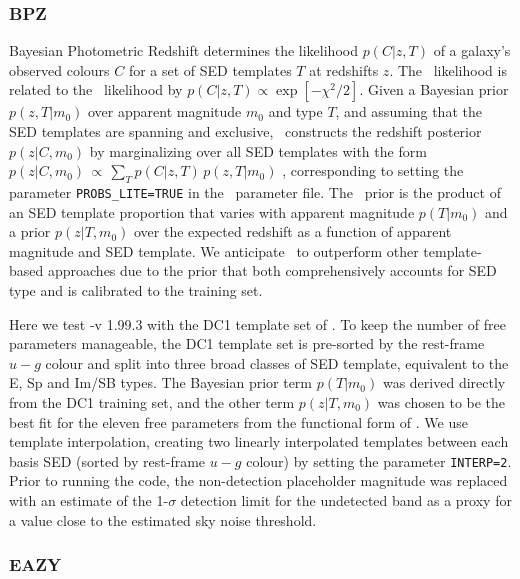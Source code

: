 \subsubsection{BPZ}

Bayesian Photometric Redshift \citep[\bpz\footnote{\url{http://www.stsci.edu/~dcoe/BPZ/}},][]{benitez_bayesian_2000} determines the likelihood $p(C \vert z, T)$ of a galaxy's observed colours $C$ for a set of SED templates $T$ at redshifts $z$.
The \bpz\ likelihood is related to the \chisq\ likelihood by $p(C \vert z, T) \propto \exp[- \chi^{2} / 2]$.
Given a Bayesian prior $p(z, T \vert m_{0})$ over apparent magnitude $m_0$ and type $T$, and assuming that the SED templates are spanning and exclusive, \bpz\ constructs the redshift posterior $p(z \vert C, m_0)$ by marginalizing over all SED templates with the form $p(z|C,m_0)\,\propto\, \sum_{T}p(C|z,T)\,p(z,T|m_0)$ \citep[Eq.~3 from][]{benitez_bayesian_2000}, corresponding to setting the parameter \texttt{PROBS\_LITE=TRUE} in the \bpz\ parameter file.
The \bpz\ prior is the product of an SED template proportion that varies with apparent magnitude $p(T \vert m_{0})$ and a prior $p(z \vert T, m_{0})$ over the expected redshift as a function of apparent magnitude and SED template.
We anticipate \bpz\ to outperform other template-based approaches due to the prior that both comprehensively accounts for SED type and is calibrated to the training set.

Here we test \bpz-v 1.99.3 with the DC1 template set of .
To keep the number of free parameters manageable, the DC1 template set is pre-sorted by the rest-frame $u-g$ colour and split into three broad classes of SED template, equivalent to the E, Sp and Im/SB types.
The Bayesian prior term $p(T \vert m_{0})$ was derived directly from the DC1 training set, and the other term $p(z \vert T, m_{0})$ was chosen to be the best fit for the eleven free parameters from the functional form of \citet{benitez_bayesian_2000}.
We use template interpolation, creating two linearly interpolated templates between each basis SED (sorted by rest-frame $u-g$ colour) by setting the parameter \texttt{INTERP=2}.
Prior to running the code, the non-detection placeholder magnitude was replaced with an estimate of the 1-$\sigma$ detection limit for the undetected band as a proxy for a value close to the estimated sky noise threshold.

\subsubsection{EAZY}

